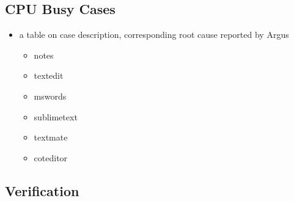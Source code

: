 \subsection{CPU Busy Cases}
\begin{itemize}
\item  a table on case description, corresponding root cause reported by Argus
	\begin{itemize}
	\item notes
	\item textedit
	\item mswords
	\item sublimetext
	\item textmate
	\item coteditor
	\end{itemize}
\end{itemize}

\subsection{Verification}

